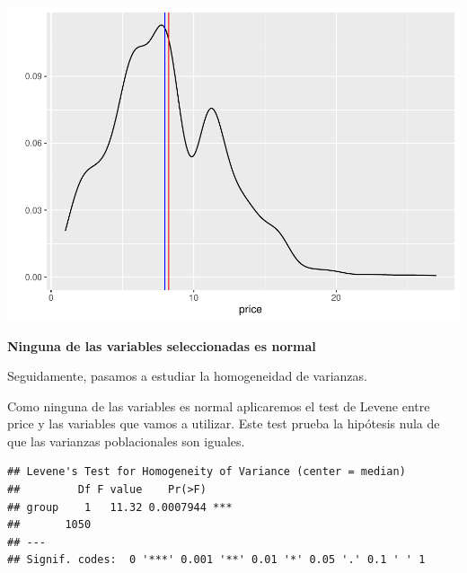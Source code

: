 \documentclass[
]{article}
\newenvironment{Shaded}{\begin{snugshade}}{\end{snugshade}}
\newcommand{\DataTypeTok}[1]{\textcolor[rgb]{0.13,0.29,0.53}{#1}}
\newcommand{\KeywordTok}[1]{\textcolor[rgb]{0.13,0.29,0.53}{\textbf{#1}}}
\newcommand{\NormalTok}[1]{#1}
\newcommand{\OperatorTok}[1]{\textcolor[rgb]{0.81,0.36,0.00}{\textbf{#1}}}
\newcommand{\StringTok}[1]{\textcolor[rgb]{0.31,0.60,0.02}{#1}}
\begin{document}
\includegraphics{PRAC2_Limpieza_Analisis_Datos---Sales_files/figure-latex/unnamed-chunk-38-1.pdf}

\textbf{Ninguna de las variables seleccionadas es normal}

Seguidamente, pasamos a estudiar la homogeneidad de varianzas.

Como ninguna de las variables es normal aplicaremos el test de Levene
entre price y las variables que vamos a utilizar. Este test prueba la
hipótesis nula de que las varianzas poblacionales son iguales.

\begin{Shaded}
\end{Shaded}

\begin{verbatim}
## Levene's Test for Homogeneity of Variance (center = median)
##         Df F value    Pr(>F)    
## group    1   11.32 0.0007944 ***
##       1050                      
## ---
## Signif. codes:  0 '***' 0.001 '**' 0.01 '*' 0.05 '.' 0.1 ' ' 1
\end{verbatim}

\begin{Shaded}
\end{Shaded}
\end{document}
